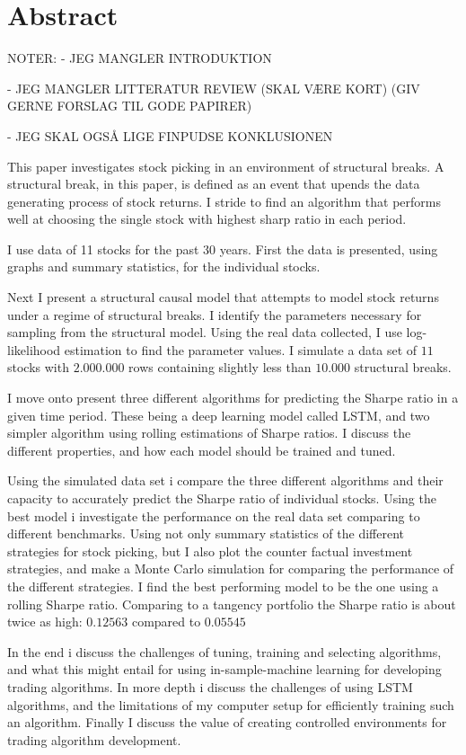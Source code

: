 \section{Abstract}

NOTER:
- JEG MANGLER INTRODUKTION

- JEG MANGLER LITTERATUR REVIEW (SKAL VÆRE KORT) (GIV GERNE FORSLAG TIL GODE PAPIRER)

- JEG SKAL OGSÅ LIGE FINPUDSE KONKLUSIONEN

This paper investigates stock picking in an environment of structural breaks. A structural break, in this paper, is defined as an event that upends the data generating process of stock returns. I stride to find an algorithm that performs well at choosing the single stock with highest sharp ratio in each period.

I use data of 11 stocks for the past 30 years. First the data is presented, using graphs and summary statistics, for the individual stocks.

Next I present a structural causal model that attempts to model stock returns under a regime of structural breaks. I identify the parameters necessary for sampling from the structural model. Using the real data collected, I use log-likelihood estimation to find the parameter values. I simulate a data set of $11$ stocks with $2.000.000$ rows containing slightly less than $10.000$ structural breaks.

I move onto present three different algorithms for predicting the Sharpe ratio in a given time period. These being a deep learning model called LSTM, and two simpler algorithm using rolling estimations of Sharpe ratios. I discuss the different properties, and how each model should be trained and tuned.

Using the simulated data set i compare the three different algorithms and their capacity to accurately predict the Sharpe ratio of individual stocks. Using the best model i investigate the performance on the real data set comparing to different benchmarks. Using not only summary statistics of the different strategies for stock picking, but I also plot the counter factual investment strategies, and make a Monte Carlo simulation for comparing the performance of the different strategies. I find the best performing model to be the one using a rolling Sharpe ratio. Comparing to a tangency portfolio the Sharpe ratio is about twice as high: $0.12563$ compared to $0.05545$

In the end i discuss the challenges of tuning, training and selecting algorithms, and what this might entail for using in-sample-machine learning for developing trading algorithms. In more depth i discuss the challenges of using LSTM algorithms, and the limitations of my computer setup for efficiently training such an algorithm. Finally I discuss the value of creating controlled environments for trading algorithm development.
